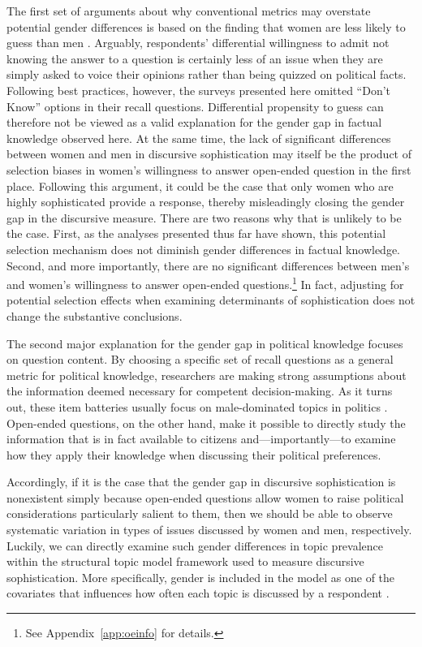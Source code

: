 The first set of arguments about why conventional metrics may overstate potential gender differences is based on the finding that women are less likely to guess than men \citep{mondak2004knowledge}. Arguably, respondents' differential willingness to admit not knowing the answer to a question is certainly less of an issue when they are simply asked to voice their opinions rather than being quizzed on political facts. Following best practices, however, the surveys presented here omitted ``Don't Know'' options in their recall questions. Differential propensity to guess can therefore not be viewed as a valid explanation for the gender gap in factual knowledge observed here. At the same time, the lack of significant differences between women and men in discursive sophistication may itself be the product of selection biases in women's willingness to answer open-ended question in the first place. Following this argument, it could be the case that only women who are highly sophisticated provide a response, thereby misleadingly closing the gender gap in the discursive measure. There are two reasons why that is unlikely to be the case. First, as the analyses presented thus far have shown, this potential selection mechanism does not diminish gender differences in factual knowledge. Second, and more importantly, there are no significant differences between men's and women's willingness to answer open-ended questions.\footnote{See Appendix~\ref{app:oeinfo} for details.} In fact, adjusting for potential selection effects when examining determinants of sophistication does not change the substantive conclusions.


The second major explanation for the gender gap in political knowledge focuses on question content. By choosing a specific set of recall questions as a general metric for political knowledge, researchers are making strong assumptions about the information deemed necessary for competent decision-making. As it turns out, these item batteries usually focus on male-dominated topics in politics \citep{dolan2011women}. Open-ended questions, on the other hand, make it possible to directly study the information that is in fact available to citizens and---importantly---to examine how they apply their knowledge when discussing their political preferences.

Accordingly, if it is the case that the gender gap in discursive sophistication is nonexistent simply because open-ended questions allow women to raise political considerations particularly salient to them, then we should be able to observe systematic variation in types of issues discussed by women and men, respectively. Luckily, we can directly examine such gender differences in topic prevalence within the structural topic model framework used to measure discursive sophistication. More specifically, gender is included in the model as one of the covariates that influences how often each topic is discussed by a respondent \citep[see also][for details]{roberts2014structural}.

